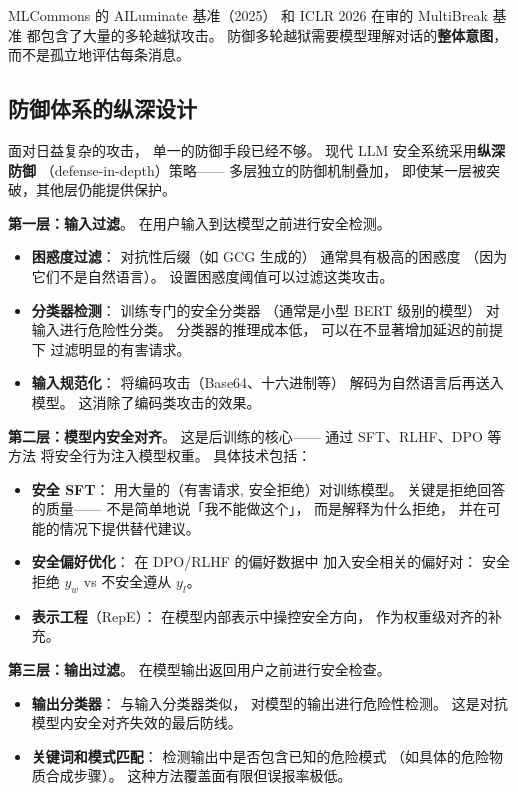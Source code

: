 MLCommons 的 AILuminate 基准（2025）
和 ICLR 2026 在审的 MultiBreak 基准
都包含了大量的多轮越狱攻击。
防御多轮越狱需要模型理解对话的\textbf{整体意图}，
而不是孤立地评估每条消息。

\subsection{防御体系的纵深设计}

面对日益复杂的攻击，
单一的防御手段已经不够。
现代 LLM 安全系统采用\textbf{纵深防御}
（defense-in-depth）策略——
多层独立的防御机制叠加，
即使某一层被突破，其他层仍能提供保护。

\textbf{第一层：输入过滤}。
在用户输入到达模型之前进行安全检测。
\begin{itemize}[noitemsep]
  \item \textbf{困惑度过滤}：
        对抗性后缀（如 GCG 生成的）
        通常具有极高的困惑度
       （因为它们不是自然语言）。
        设置困惑度阈值可以过滤这类攻击。
  \item \textbf{分类器检测}：
        训练专门的安全分类器
       （通常是小型 BERT 级别的模型）
        对输入进行危险性分类。
        分类器的推理成本低，
        可以在不显著增加延迟的前提下
        过滤明显的有害请求。
  \item \textbf{输入规范化}：
        将编码攻击（Base64、十六进制等）
        解码为自然语言后再送入模型。
        这消除了编码类攻击的效果。
\end{itemize}

\textbf{第二层：模型内安全对齐}。
这是后训练的核心——
通过 SFT、RLHF、DPO 等方法
将安全行为注入模型权重。
具体技术包括：
\begin{itemize}[noitemsep]
  \item \textbf{安全 SFT}：
        用大量的（有害请求, 安全拒绝）对训练模型。
        关键是拒绝回答的质量——
        不是简单地说「我不能做这个」，
        而是解释为什么拒绝，
        并在可能的情况下提供替代建议。
  \item \textbf{安全偏好优化}：
        在 DPO/RLHF 的偏好数据中
        加入安全相关的偏好对：
        安全拒绝 $y_w$ vs 不安全遵从 $y_l$。
  \item \textbf{表示工程}（RepE）：
        在模型内部表示中操控安全方向，
        作为权重级对齐的补充。
\end{itemize}

\textbf{第三层：输出过滤}。
在模型输出返回用户之前进行安全检查。
\begin{itemize}[noitemsep]
  \item \textbf{输出分类器}：
        与输入分类器类似，
        对模型的输出进行危险性检测。
        这是对抗模型内安全对齐失效的最后防线。
  \item \textbf{关键词和模式匹配}：
        检测输出中是否包含已知的危险模式
       （如具体的危险物质合成步骤）。
        这种方法覆盖面有限但误报率极低。
\end{itemize}

